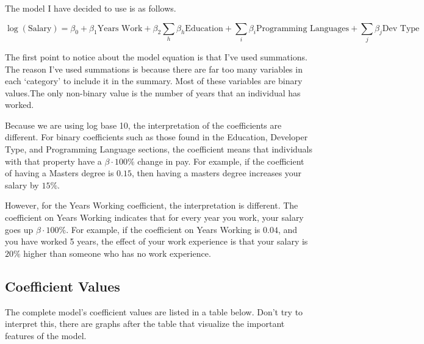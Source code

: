 \documentclass{report}
\begin{document}
The model I have decided to use is as follows.

$$\log(\text{Salary}) = \beta_0 + \beta_1 \text{Years Work} + \beta_2 \sum_h{\beta_h \text{Education}} + \sum_i{\beta_i \text{Programming Languages}} + \sum_j{\beta_j \text{Dev Type}}$$

The first point to notice about the model equation is that I've used summations. The reason I've used summations is because there are far too many variables in each `category' to include it in the summary. Most of these variables are binary values.The only non-binary value is the number of years that an individual has worked.

Because we are using log base 10, the interpretation of the coefficients are different. For binary coefficients such as those found in the Education, Developer Type, and Programming Language sections, the coefficient means that individuals with that property have a $\beta \cdot 100\%$ change in pay. For example, if the coefficient of having a Masters degree is $0.15$, then having a masters degree increases your salary by $15\%$.

However, for the Years Working coefficient, the interpretation is different. The coefficient on Years Working indicates that for every year you work, your salary goes up $\beta \cdot 100\%$. For example, if the coefficient on Years Working is $0.04$, and you have worked 5 years, the effect of your work experience is that your salary is $20\%$ higher than someone who has no work experience.


\subsection{Coefficient Values}

The complete model's coefficient values are listed in a table below. Don't try to interpret this, there are graphs after the table that visualize the important features of the model.
\end{document}
